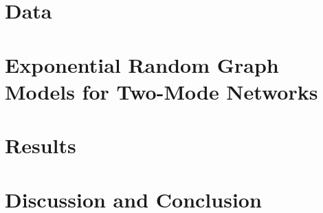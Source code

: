 \documentclass[preprint,12pt,authoryear]{elsarticle}
\begin{document}
\section{Data}
\label{sec:data}
\section{Exponential Random Graph Models for Two-Mode Networks}
\label{sec:ermgs}
\section{Results}
\label{sec:results}
\section{Discussion and Conclusion}
\label{sec:disc}






\newpage
 






\end{document}
